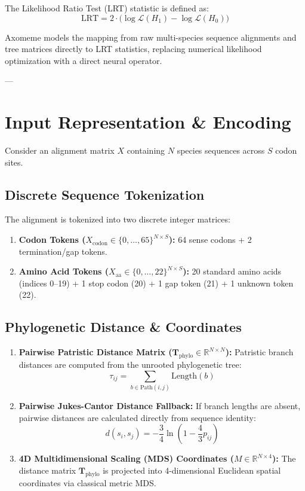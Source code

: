 \documentclass[11pt,a4paper]{article}
\begin{document}
The Likelihood Ratio Test (LRT) statistic is defined as:
\begin{equation}
\text{LRT} = 2 \cdot \Big(\log \mathcal{L}(H_1) - \log \mathcal{L}(H_0)\Big)
\end{equation}

Axomeme models the mapping from raw multi-species sequence alignments and tree matrices directly to LRT statistics, replacing numerical likelihood optimization with a direct neural operator.

---

\section{Input Representation \& Encoding}

Consider an alignment matrix $X$ containing $N$ species sequences across $S$ codon sites.

\subsection{Discrete Sequence Tokenization}
The alignment is tokenized into two discrete integer matrices:
\begin{enumerate}
    \item \textbf{Codon Tokens ($X_{\text{codon}} \in \{0, \dots, 65\}^{N \times S}$):} 64 sense codons + 2 termination/gap tokens.
    \item \textbf{Amino Acid Tokens ($X_{\text{aa}} \in \{0, \dots, 22\}^{N \times S}$):} 20 standard amino acids (indices 0--19) + 1 stop codon (20) + 1 gap token (21) + 1 unknown token (22).
\end{enumerate}

\subsection{Phylogenetic Distance \& Coordinates}
\begin{enumerate}
    \item \textbf{Pairwise Patristic Distance Matrix ($\mathbf{T}_{\text{phylo}} \in \mathbb{R}^{N \times N}$):} Patristic branch distances are computed from the unrooted phylogenetic tree:
    \begin{equation}
    \tau_{ij} = \sum_{b \in \text{Path}(i, j)} \text{Length}(b)
    \end{equation}
    \item \textbf{Pairwise Jukes-Cantor Distance Fallback:} If branch lengths are absent, pairwise distances are calculated directly from sequence identity:
    \begin{equation}
    d(s_i, s_j) = -\frac{3}{4} \ln\left(1 - \frac{4}{3} p_{ij}\right)
    \end{equation}
    \item \textbf{4D Multidimensional Scaling (MDS) Coordinates ($M \in \mathbb{R}^{N \times 4}$):} The distance matrix $\mathbf{T}_{\text{phylo}}$ is projected into 4-dimensional Euclidean spatial coordinates via classical metric MDS.
\end{enumerate}
\end{document}
